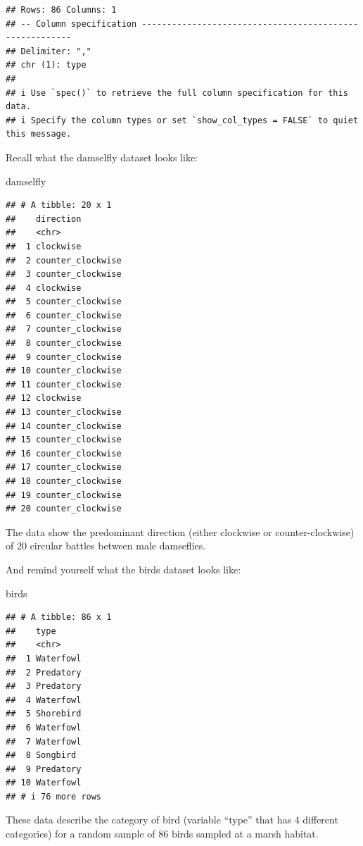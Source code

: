 \documentclass[
]{book}
\newenvironment{Shaded}{\begin{snugshade}}{\end{snugshade}}
\newcommand{\NormalTok}[1]{#1}
\begin{document}
\begin{verbatim}
## Rows: 86 Columns: 1
## -- Column specification --------------------------------------------------------
## Delimiter: ","
## chr (1): type
## 
## i Use `spec()` to retrieve the full column specification for this data.
## i Specify the column types or set `show_col_types = FALSE` to quiet this message.
\end{verbatim}

Recall what the damselfly dataset looks like:

\begin{Shaded}
\begin{Highlighting}[]
\NormalTok{damselfly}
\end{Highlighting}
\end{Shaded}

\begin{verbatim}
## # A tibble: 20 x 1
##    direction        
##    <chr>            
##  1 clockwise        
##  2 counter_clockwise
##  3 counter_clockwise
##  4 clockwise        
##  5 counter_clockwise
##  6 counter_clockwise
##  7 counter_clockwise
##  8 counter_clockwise
##  9 counter_clockwise
## 10 counter_clockwise
## 11 counter_clockwise
## 12 clockwise        
## 13 counter_clockwise
## 14 counter_clockwise
## 15 counter_clockwise
## 16 counter_clockwise
## 17 counter_clockwise
## 18 counter_clockwise
## 19 counter_clockwise
## 20 counter_clockwise
\end{verbatim}

The data show the predominant direction (either clockwise or counter-clockwise) of 20 circular battles between male damseflies.

And remind yourself what the birds dataset looks like:

\begin{Shaded}
\begin{Highlighting}[]
\NormalTok{birds}
\end{Highlighting}
\end{Shaded}

\begin{verbatim}
## # A tibble: 86 x 1
##    type     
##    <chr>    
##  1 Waterfowl
##  2 Predatory
##  3 Predatory
##  4 Waterfowl
##  5 Shorebird
##  6 Waterfowl
##  7 Waterfowl
##  8 Songbird 
##  9 Predatory
## 10 Waterfowl
## # i 76 more rows
\end{verbatim}

These data describe the category of bird (variable ``type'' that has 4 different categories) for a random sample of 86 birds sampled at a marsh habitat.
\end{document}
